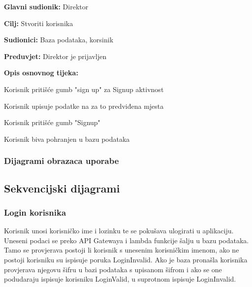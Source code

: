 	
	
	\noindent {}
	\begin{packed_item}
		
		\item \textbf{Glavni sudionik: }Direktor
		\item  \textbf{Cilj:} Stvoriti korisnika
		\item  \textbf{Sudionici:} Baza podataka, korsinik
		\item  \textbf{Preduvjet:} Direktor je prijavljen
		\item  \textbf{Opis osnovnog tijeka:}
		
		\item[] \begin{packed_enum}
			
			\item Korisnik pritišće gumb "sign up" za 
			Signup aktivnost
			\item Korisnik upisuje podatke na za to predviđena mjesta
			\item Korisnik pritišće gumb "Signup"
			\item Korisnik biva pohranjen u bazu podataka
			
			
		\end{packed_enum}		
	\end{packed_item}
				
					
				\subsubsection{Dijagrami obrazaca uporabe}
					
				
					
				
			\subsection{Sekvencijski dijagrami}
			\subsubsection{Login korisnika}
			
			Korisnik unosi korisničko ime i lozinku te se pokušava ulogirati u aplikaciju. Uneseni podaci se preko API Gatewaya i lambda funkcije šalju u bazu podataka. Tamo se provjerava postoji li korisnik s unesenim korisničkim imenom, ako ne postoji korisniku su ispisuje poruka LoginInvalid. Ako je baza pronašla korisnika provjerava njegovu šifru u bazi podataka s upisanom šifrom i ako se one podudaraju ispisuje korisniku LoginValid, u suprotnom ispisuje LoginInvalid.
			\eject
			
